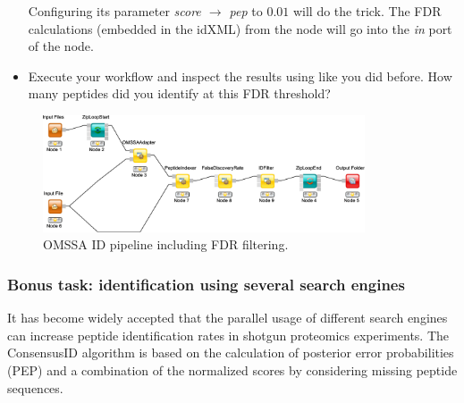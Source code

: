 \begin{itemize}
Configuring its parameter \textit{score $\rightarrow$ pep} to $0.01$ will do the trick.
The FDR calculations (embedded in the idXML) from the  node will go into the \textit{in} port of the  node.
\item
Execute your workflow and inspect the results using  like you did before.
How many peptides did you identify at this FDR threshold?
\end{itemize}

\begin{figure}[htbp]
  \centering
  \includegraphics[width=0.85\textwidth]{graphics/labelfree/fdr_peptide_identification}
  \caption{OMSSA ID pipeline including FDR filtering.}
  \label{fig:id_fdr}
\end{figure}

\subsubsection{Bonus task: identification using several search engines}
It has become widely accepted that the parallel usage of different search engines can increase peptide identification rates in shotgun proteomics experiments. The ConsensusID algorithm is based on the calculation of posterior error probabilities (PEP) and a combination of the normalized scores by considering missing peptide sequences.

